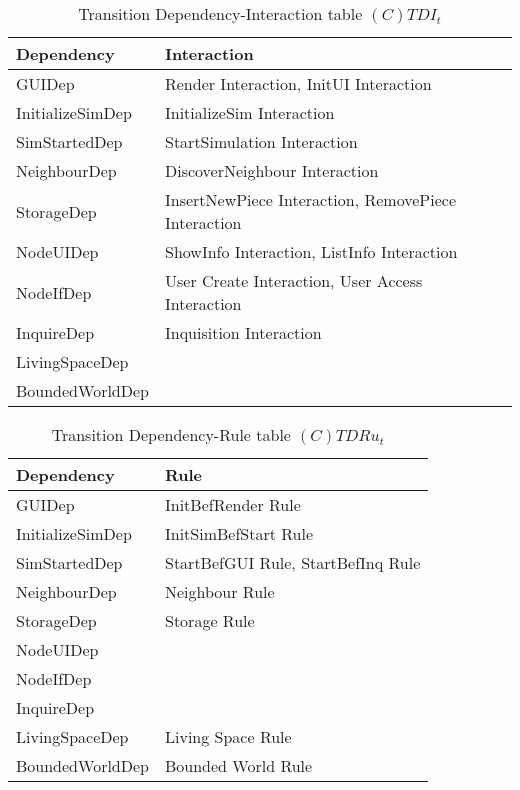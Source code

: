 \begin{table}[H]
	\centering
	\begin{tabular}{|p{4cm}|p{8cm}|}
			\hline
			\textbf{Dependency} & \textbf{Interaction} \\
			\hline
			GUIDep & Render Interaction, InitUI Interaction \\
			\hline
			InitializeSimDep & InitializeSim Interaction\\
			\hline
			SimStartedDep & StartSimulation Interaction \\
			\hline
			NeighbourDep & DiscoverNeighbour Interaction\\
			\hline
			StorageDep & InsertNewPiece Interaction, RemovePiece Interaction \\
			\hline
			NodeUIDep & ShowInfo Interaction, ListInfo Interaction \\
			\hline
			NodeIfDep & User Create Interaction, User Access Interaction \\
			\hline
			InquireDep & Inquisition Interaction\\
			\hline
			LivingSpaceDep & \\
			\hline
			BoundedWorldDep & \\
			\hline
		\end{tabular}
	\caption{Transition Dependency-Interaction table $(C)TDI_t$}
	\label{tab:ctdit}
\end{table}

\begin{table}[H]
	\centering
	\begin{tabular}{|p{4cm}|p{8cm}|}
			\hline
			\textbf{Dependency} & \textbf{Rule} \\
			\hline
			GUIDep & InitBefRender Rule\\
			\hline
			InitializeSimDep & InitSimBefStart Rule \\
			\hline
			SimStartedDep & StartBefGUI Rule, StartBefInq Rule\\
			\hline
			NeighbourDep & Neighbour Rule\\
			\hline
			StorageDep & Storage Rule \\
			\hline
			NodeUIDep & \\
			\hline
			NodeIfDep & \\
			\hline
			InquireDep & \\
			\hline
			LivingSpaceDep & Living Space Rule\\
			\hline
			BoundedWorldDep & Bounded World Rule\\
			\hline
		\end{tabular}
	\caption{Transition Dependency-Rule table $(C)TDRu_t$}
	\label{tab:ctdrut}
\end{table}

